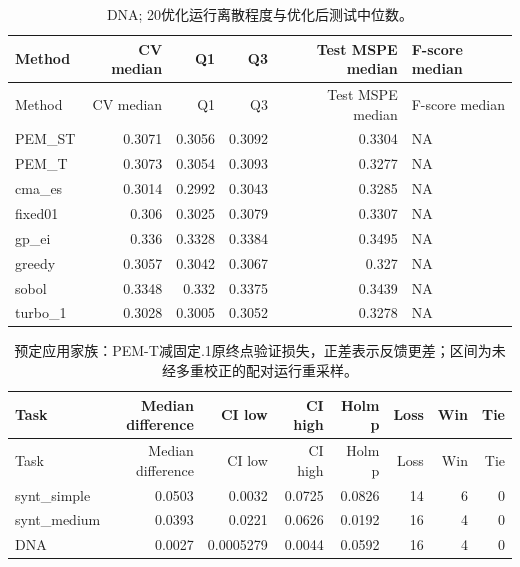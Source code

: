 \documentclass[11pt,a4paper]{article}
\begin{document}
\par\noindent\begin{minipage}{\linewidth}

\begin{longtable}[]{@{}lrrrrl@{}}
\caption{DNA; 20优化运行离散程度与优化后测试中位数。}\tabularnewline
\toprule
Method & CV median & Q1 & Q3 & Test MSPE median & F-score median \\
\midrule
\endfirsthead
\toprule
Method & CV median & Q1 & Q3 & Test MSPE median & F-score median \\
\midrule
\endhead
PEM\_ST & 0.3071 & 0.3056 & 0.3092 & 0.3304 & NA \\
PEM\_T & 0.3073 & 0.3054 & 0.3093 & 0.3277 & NA \\
cma\_es & 0.3014 & 0.2992 & 0.3043 & 0.3285 & NA \\
fixed01 & 0.306 & 0.3025 & 0.3079 & 0.3307 & NA \\
gp\_ei & 0.336 & 0.3328 & 0.3384 & 0.3495 & NA \\
greedy & 0.3057 & 0.3042 & 0.3067 & 0.327 & NA \\
sobol & 0.3348 & 0.332 & 0.3375 & 0.3439 & NA \\
turbo\_1 & 0.3028 & 0.3005 & 0.3052 & 0.3278 & NA \\
\bottomrule
\end{longtable}

\end{minipage}\par

\par\noindent\begin{minipage}{\linewidth}

\begin{longtable}[]{@{}lrrrrrrr@{}}
\caption{预定应用家族：PEM-T减固定.1原终点验证损失，正差表示反馈更差；区间为未经多重校正的配对运行重采样。}\tabularnewline
\toprule
Task & Median difference & CI low & CI high & Holm p & Loss & Win &
Tie \\
\midrule
\endfirsthead
\toprule
Task & Median difference & CI low & CI high & Holm p & Loss & Win &
Tie \\
\midrule
\endhead
synt\_simple & 0.0503 & 0.0032 & 0.0725 & 0.0826 & 14 & 6 & 0 \\
synt\_medium & 0.0393 & 0.0221 & 0.0626 & 0.0192 & 16 & 4 & 0 \\
DNA & 0.0027 & 0.0005279 & 0.0044 & 0.0592 & 16 & 4 & 0 \\
\bottomrule
\end{longtable}

\end{minipage}\par
\end{document}
